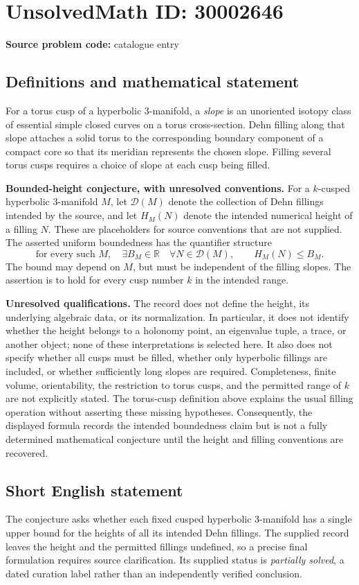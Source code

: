 \documentclass[11pt]{article}
\newcommand{\R}{\mathbb{R}}
\begin{document}
\section*{UnsolvedMath ID: 30002646}
\textbf{Source problem code:} catalogue entry
\subsection{Definitions and mathematical statement}
For a torus cusp of a hyperbolic \(3\)-manifold, a \emph{slope} is an unoriented isotopy class of essential simple closed curves on a torus cross-section. Dehn filling along that slope attaches a solid torus to the corresponding boundary component of a compact core so that its meridian represents the chosen slope. Filling several torus cusps requires a choice of slope at each cusp being filled.

\textbf{Bounded-height conjecture, with unresolved conventions.} For a \(k\)-cusped hyperbolic \(3\)-manifold \(M\), let \(\mathcal D(M)\) denote the collection of Dehn fillings intended by the source, and let \(H_M(N)\) denote the intended numerical height of a filling \(N\). These are placeholders for source conventions that are not supplied. The asserted uniform boundedness has the quantifier structure
\[
\text{for every such }M,\quad
\exists B_M\in\R\quad
\forall N\in\mathcal D(M),\qquad H_M(N)\le B_M.
\]
The bound may depend on \(M\), but must be independent of the filling slopes. The assertion is to hold for every cusp number \(k\) in the intended range.

\textbf{Unresolved qualifications.} The record does not define the height, its underlying algebraic data, or its normalization. In particular, it does not identify whether the height belongs to a holonomy point, an eigenvalue tuple, a trace, or another object; none of these interpretations is selected here. It also does not specify whether all cusps must be filled, whether only hyperbolic fillings are included, or whether sufficiently long slopes are required. Completeness, finite volume, orientability, the restriction to torus cusps, and the permitted range of \(k\) are not explicitly stated. The torus-cusp definition above explains the usual filling operation without asserting these missing hypotheses. Consequently, the displayed formula records the intended boundedness claim but is not a fully determined mathematical conjecture until the height and filling conventions are recovered.
\subsection{Short English statement}
The conjecture asks whether each fixed cusped hyperbolic \(3\)-manifold has a single upper bound for the heights of all its intended Dehn fillings. The supplied record leaves the height and the permitted fillings undefined, so a precise final formulation requires source clarification. Its supplied status is \emph{partially solved}, a dated curation label rather than an independently verified conclusion.
\end{document}
